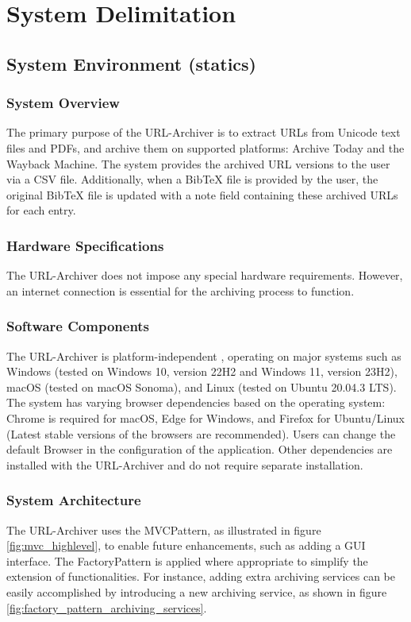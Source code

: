 \section{System Delimitation}

\subsection{System Environment (statics)}
\subsubsection{System Overview}
The primary purpose of the URL-Archiver is to extract URLs from Unicode text files and PDFs, and archive them on supported platforms: Archive Today and the Wayback Machine. The system provides the archived URL versions to the user via a CSV file. Additionally, when a BibTeX file is provided by the user, the original BibTeX file is updated with a note field containing these archived URLs for each entry.

\subsubsection{Hardware Specifications}
The URL-Archiver does not impose any special hardware requirements. However, an internet connection  is essential for the archiving process to function.

\subsubsection{Software Components}
The URL-Archiver is platform-independent , operating on major systems such as Windows (tested on Windows 10, version 22H2  and Windows 11, version 23H2), macOS (tested on macOS Sonoma), and Linux (tested on Ubuntu 20.04.3 LTS). The system has varying browser dependencies based on the operating system: Chrome is required for macOS, Edge for Windows, and Firefox for Ubuntu/Linux (Latest stable versions of the browsers are recommended). Users can change the default Browser in the configuration of the application. Other dependencies are installed with the URL-Archiver and do not require separate installation.

\subsubsection{System Architecture}
The URL-Archiver uses the \gls{MVCPattern}, as illustrated in figure \ref{fig:mvc_highlevel}, to enable future enhancements, such as adding a \gls{GUI} interface. The \gls{FactoryPattern} is applied where appropriate to simplify the extension of functionalities. For instance, adding extra archiving services can be easily accomplished by introducing a new archiving service, as shown in figure \ref{fig:factory_pattern_archiving_services}.

